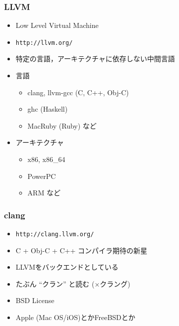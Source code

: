 \documentclass[12pt,xgraphicx=dvips,xcolor=dvips]{beamer}
\begin{document}
\begin{frame}
  \frametitle{LLVM}

  \begin{itemize}
    \setlength{\itemsep}{1.5zh}
    \item \alert{L}ow \alert{L}evel \alert{V}irtual \alert{M}achine
    \item {\tt http://llvm.org/}
    \item 特定の言語，アーキテクチャに依存しない中間言語
    \item 言語
      \begin{itemize}
        \item clang, llvm-gcc (C, C++, Obj-C)
        \item ghc (Haskell)
        \item MacRuby (Ruby) など
      \end{itemize}
    \item アーキテクチャ
      \begin{itemize}
        \item x86, x86\_64
        \item PowerPC
        \item ARM など
      \end{itemize}
  \end{itemize}
\end{frame}

\begin{frame}
  \frametitle{clang}

  \begin{itemize}
    \setlength{\itemsep}{1.5zh}
    \item {\tt http://clang.llvm.org/}
    \item C + Obj-C + C++ コンパイラ期待の\alert{新星}
    \item LLVMをバックエンドとしている
    \item たぶん ``クラン'' と読む (×クラング)
    \item BSD License
    \item Apple (Mac OS/iOS)とかFreeBSDとか
  \end{itemize}
\end{frame}
\end{document}

